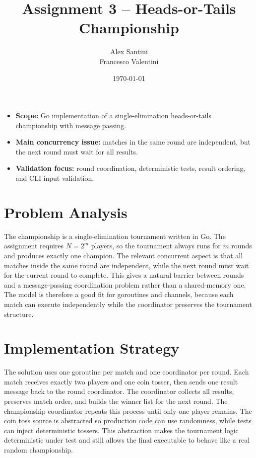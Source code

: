 \documentclass[11pt,a4paper]{article}
\title{\vspace{-1.5cm}Assignment 3 -- Heads-or-Tails Championship}
\author{Alex Santini \\ Francesco Valentini}
\date{\today}
\begin{document}
\maketitle

\begin{itemize}
  \item \textbf{Scope:} Go implementation of a single-elimination heads-or-tails championship with message passing.
  \item \textbf{Main concurrency issue:} matches in the same round are independent, but the next round must wait for all results.
  \item \textbf{Validation focus:} round coordination, deterministic tests, result ordering, and CLI input validation.
\end{itemize}

\section*{Problem Analysis}
The championship is a single-elimination tournament written in Go.
The assignment requires $N = 2^m$ players, so the tournament always runs for $m$ rounds and produces exactly one champion.
The relevant concurrent aspect is that all matches inside the same round are independent, while the next round must wait for the current round to complete.
This gives a natural barrier between rounds and a message-passing coordination problem rather than a shared-memory one.
The model is therefore a good fit for goroutines and channels, because each match can execute independently while the coordinator preserves the tournament structure.

\section*{Implementation Strategy}
The solution uses one goroutine per match and one coordinator per round.
Each match receives exactly two players and one coin tosser, then sends one result message back to the round coordinator.
The coordinator collects all results, preserves match order, and builds the winner list for the next round.
The championship coordinator repeats this process until only one player remains.
The coin toss source is abstracted so production code can use randomness, while tests can inject deterministic tossers.
This abstraction makes the tournament logic deterministic under test and still allows the final executable to behave like a real random championship.
\end{document}
